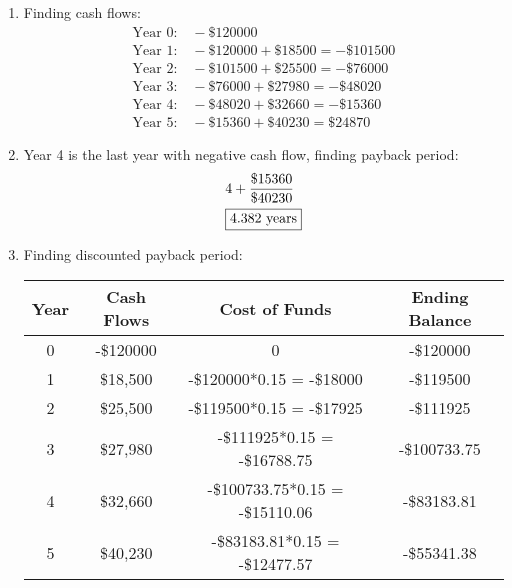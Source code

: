 \documentclass[../INDE250HW.tex]{subfiles}
\begin{document}
\begin{enumerate}
    \item Finding cash flows:
        \begin{equation*}
            \begin{aligned}
                \text{Year 0:} \quad -\$120000 \\
                \text{Year 1:} \quad -\$120000 + \$18500 = -\$101500 \\
                \text{Year 2:} \quad -\$101500 + \$25500 = -\$76000 \\
                \text{Year 3:} \quad -\$76000 + \$27980 = -\$48020 \\
                \text{Year 4:} \quad -\$48020 + \$32660 = -\$15360 \\
                \text{Year 5:} \quad -\$15360 + \$40230 = \$24870
            \end{aligned}
        \end{equation*}
    \item Year 4 is the last year with negative cash flow, finding payback period:
        \begin{equation*}
            \begin{aligned}
                &4 + \frac{\$15360}{\$40230} \\
                &\framebox{$4.382\text{ years}$} 
            \end{aligned}
        \end{equation*}
    \item Finding discounted payback period: \\
        \begin{tabular}{ c c c c }
            Year & Cash Flows & Cost of Funds & Ending Balance\\
            \hline
            0   &   -\$120000   &   0   &   -\$120000 \\   
            1   &   \$18,500    &   -\$120000*0.15 = -\$18000   &   -\$119500 \\
            2   &   \$25,500    &   -\$119500*0.15 = -\$17925   &   -\$111925 \\
            3   &   \$27,980    &   -\$111925*0.15 = -\$16788.75    &   -\$100733.75 \\
            4   &   \$32,660    &   -\$100733.75*0.15 = -\$15110.06 &   -\$83183.81\\
            5   &   \$40,230    &   -\$83183.81*0.15 = -\$12477.57 & -\$55341.38
        \end{tabular}
        \newline
\end{enumerate}
\end{document}
